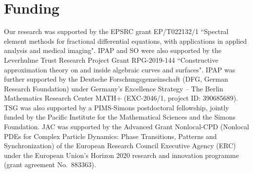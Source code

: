 \documentclass[10pt,a4paper]{article}
\numberwithin{equation}{section}
\begin{document}
\section*{Funding}  Our research was supported by the EPSRC grant EP/T022132/1 ``Spectral element methods for fractional differential equations, with applications in applied analysis and medical imaging". IPAP and SO were also supported by the Leverhulme Trust Research Project Grant RPG-2019-144 ``Constructive approximation theory on and inside algebraic curves and surfaces". IPAP was further supported by the Deutsche Forschungsgemeinschaft (DFG, German Research Foundation) under Germany's Excellence Strategy -- The Berlin Mathematics Research Center MATH+ (EXC-2046/1, project ID: 390685689). TSG was also supported by a PIMS-Simons postdoctoral fellowship, jointly funded by the Pacific Institute for the Mathematical Sciences and the Simons Foundation. JAC was supported by the Advanced Grant Nonlocal-CPD (Nonlocal PDEs for Complex Particle Dynamics: Phase Transitions, Patterns and Synchronization) of the European Research Council Executive Agency (ERC) under the European Union’s Horizon 2020 research and innovation programme (grant agreement No.~883363).

\printbibliography
\end{document}
